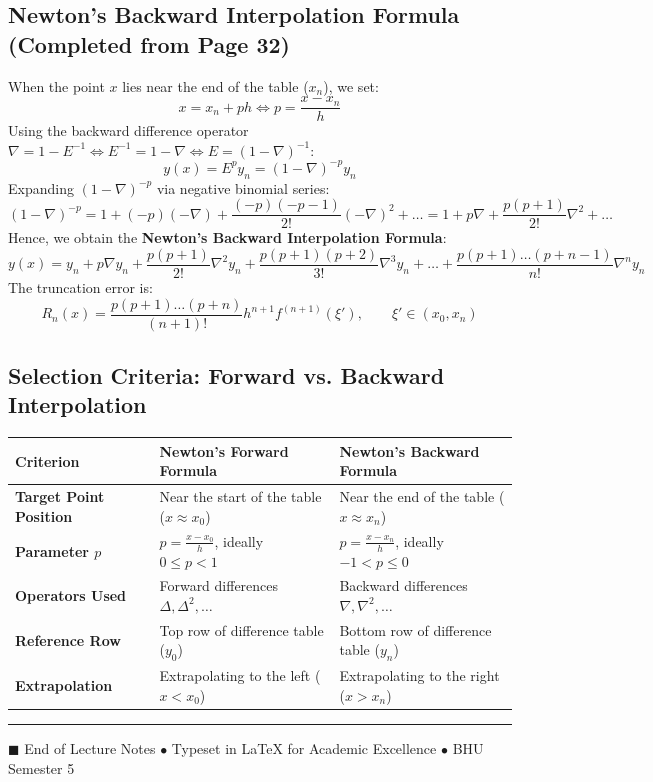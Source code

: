 \documentclass[11pt,a4paper]{article}
\begin{document}
\subsection{Newton's Backward Interpolation Formula (Completed from Page 32)}
When the point $x$ lies near the end of the table ($x_n$), we set:
\begin{equation}
    x = x_n + p h \iff p = \frac{x - x_n}{h}
\end{equation}
Using the backward difference operator $\nabla = 1 - E^{-1} \iff E^{-1} = 1 - \nabla \iff E = (1 - \nabla)^{-1}$:
\begin{equation}
    y(x) = E^p y_n = (1 - \nabla)^{-p} y_n
\end{equation}
Expanding $(1 - \nabla)^{-p}$ via negative binomial series:
\begin{equation}
    (1 - \nabla)^{-p} = 1 + (-p)(-\nabla) + \frac{(-p)(-p-1)}{2!}(-\nabla)^2 + \dots = 1 + p\nabla + \frac{p(p+1)}{2!}\nabla^2 + \dots
\end{equation}
Hence, we obtain the \textbf{Newton's Backward Interpolation Formula}:
\begin{equation}
    \boxed{y(x) = y_n + p \nabla y_n + \frac{p(p+1)}{2!} \nabla^2 y_n + \frac{p(p+1)(p+2)}{3!} \nabla^3 y_n + \dots + \frac{p(p+1)\dots(p+n-1)}{n!} \nabla^n y_n}
\end{equation}
The truncation error is:
\begin{equation}
    R_n(x) = \frac{p(p+1)\dots(p+n)}{(n+1)!} h^{n+1} f^{(n+1)}(\xi'), \qquad \xi' \in (x_0, x_n)
\end{equation}

\subsection{Selection Criteria: Forward vs. Backward Interpolation}
\begin{center}
\begin{tabular}{p{3.5cm}p{6cm}p{6cm}}
    \toprule
    \textbf{Criterion} & \textbf{Newton's Forward Formula} & \textbf{Newton's Backward Formula} \\
    \midrule
    \textbf{Target Point Position} & Near the start of the table ($x \approx x_0$) & Near the end of the table ($x \approx x_n$) \\
    \textbf{Parameter $p$} & $p = \frac{x - x_0}{h}$, ideally $0 \le p < 1$ & $p = \frac{x - x_n}{h}$, ideally $-1 < p \le 0$ \\
    \textbf{Operators Used} & Forward differences $\Delta, \Delta^2, \dots$ & Backward differences $\nabla, \nabla^2, \dots$ \\
    \textbf{Reference Row} & Top row of difference table ($y_0$) & Bottom row of difference table ($y_n$) \\
    \textbf{Extrapolation} & Extrapolating to the left ($x < x_0$) & Extrapolating to the right ($x > x_n$) \\
    \bottomrule
\end{tabular}
\end{center}

\vspace{10pt}
\hrule
\begin{center}
    {\small\color{subtle} $\blacksquare$ End of Lecture Notes $\bullet$ Typeset in \LaTeX{} for Academic Excellence $\bullet$ BHU Semester 5}
\end{center}
\end{document}
